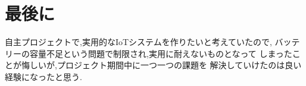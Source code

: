 \section{最後に}
自主プロジェクトで,実用的なIoTシステムを作りたいと考えていたので,
バッテリーの容量不足という問題で制限され,実用に耐えないものとなって
しまったことが悔しいが,プロジェクト期間中に一つ一つの課題を
解決していけたのは良い経験になったと思う.

